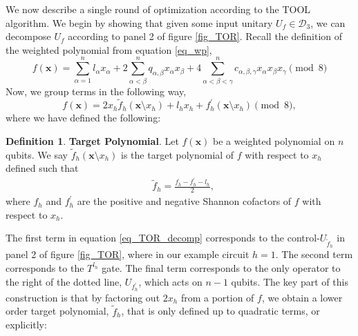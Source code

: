 \documentclass[notitlepage]{article}
\theoremstyle{definition}
\newtheorem{definition}{Definition}[section]
\theoremstyle{problem}
\theoremstyle{lemma}
\begin{document}
We now describe a single round of optimization according to the TOOL algorithm. We begin by showing that given some input unitary $U_f \in \mathcal{D}_3$, we can decompose $U_f$ according to panel 2 of figure \ref{fig_TOR}. Recall the definition of the weighted polynomial from equation \ref{eq_wp},
\begin{equation}
f(\mathbf{x}) = \sum_{\alpha=1}^{n}l_{\alpha}x_\alpha + 2\sum_{\alpha<\beta}^{n} q_{\alpha,\beta}x_\alpha x_\beta + 4\sum_{\alpha<\beta<\gamma}^{n}c_{\alpha,\beta,\gamma}x_\alpha x_\beta x_\gamma \pmod{8}
\end{equation}
Now, we group terms in the following way,
\begin{equation}
\label{eq_TOR_decomp}
f(\mathbf{x}) = 2x_h\tilde{f}_{h}(\mathbf{x}\setminus x_h) + l_h x_h + f^\prime_{h}(\mathbf{x}\setminus x_h) \pmod{8},
\end{equation}
where we have defined the following:

\begin{definition}{\textbf{Target Polynomial}. }
	Let $f(\mathbf{x})$ be a weighted polynomial on $n$ qubits. We say $\tilde{f}_{h}(\mathbf{x}\setminus x_h)$ is the target polynomial of $f$ with respect to $x_h$ defined such that
	\begin{align}	
	&\tilde{f}_{h} = \frac{f_{h}-f^\prime_{h}-l_h}{2},
	\end{align}
	where $f_{h}$ and $f^\prime_{h}$ are the positive and negative Shannon cofactors of $f$ with respect to $x_h$.	
\end{definition}
The first term in equation \ref{eq_TOR_decomp} corresponds to the control-$U_{\tilde{f}_{h}}$ in panel 2 of figure \ref{fig_TOR}, where in our example circuit $h=1$. The second term corresponds to the $T^{l_h}$ gate. The final term corresponds to the only operator to the right of the dotted line, $U_{f^\prime_{h}}$, which acts on $n-1$ qubits. The key part of this construction is that by factoring out $2x_h$ from a portion of $f$, we obtain a lower order target polynomial, $\tilde{f}_{h}$, that is only defined up to quadratic terms, or explicitly:
\end{document}
